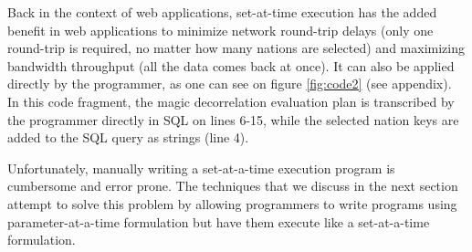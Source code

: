Back in the context of web applications, set-at-time execution has the added benefit in web applications to minimize network round-trip delays (only one round-trip is required, no matter how many nations are selected) and  maximizing bandwidth throughput (all the data comes back at once). It can also be applied directly by the programmer, as one can see on figure \ref{fig:code2} (see appendix). In this code fragment, the magic decorrelation evaluation plan is transcribed by the programmer directly in SQL on lines 6-15, while the selected nation keys are added to the SQL query as strings (line 4).

Unfortunately, manually writing a set-at-a-time execution program is cumbersome and error prone. The techniques that we discuss in the next section attempt to solve this problem by allowing programmers to write programs using parameter-at-a-time formulation but have them execute like a set-at-a-time formulation.






